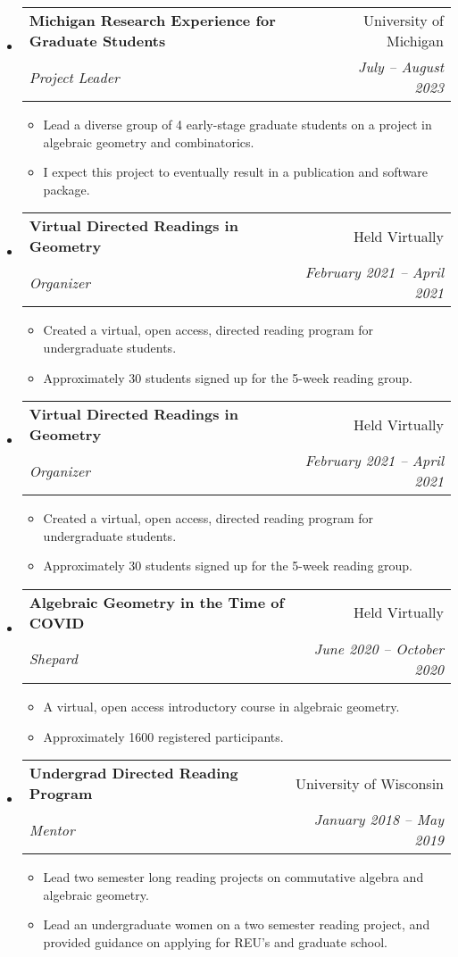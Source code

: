 \documentclass[letterpaper,11pt]{article}
\makeatletter
\newcommand{\resitem}[1]{\item #1 \vspace{-2pt}}
\newcommand{\ressubheading}[4]{
\begin{tabular*}{6.5in}[t]{l@{\cftdotfill{\cftsecdotsep}\extracolsep{\fill}}r}
		\textbf{#1} & #2 \\
		\textit{#3} & \textit{#4} \\
\end{tabular*}\vspace{-6pt}}
\makeatother
\begin{document}
\begin{itemize}

%
%
\item 
	\ressubheading{Michigan Research Experience for Graduate Students }{University of Michigan}{Project Leader}{July -- August 2023}
	\begin{itemize}
		\resitem{Lead a diverse group of 4 early-stage graduate students on a project in algebraic geometry and combinatorics.}
		\resitem{I expect this project to eventually result in a publication and software package.}
	\end{itemize}
	
\item 
	\ressubheading{Virtual Directed Readings in Geometry}{Held Virtually}{Organizer}{February 2021 -- April 2021}
	\begin{itemize}
		\resitem{Created a virtual, open access, directed reading program for undergraduate students.}
		\resitem{Approximately 30 students signed up for the 5-week reading group.}
	\end{itemize}


\item 
	\ressubheading{Virtual Directed Readings in Geometry}{Held Virtually}{Organizer}{February 2021 -- April 2021}
	\begin{itemize}
		\resitem{Created a virtual, open access, directed reading program for undergraduate students.}
		\resitem{Approximately 30 students signed up for the 5-week reading group.}
	\end{itemize}

\item 
	\ressubheading{Algebraic Geometry in the Time of COVID}{Held Virtually}{Shepard}{June 2020 -- October 2020}
	\begin{itemize}
		\resitem{A virtual, open access introductory course in algebraic geometry.}
		\resitem{Approximately 1600 registered participants.}
	\end{itemize}
		
%
%
%	
\item 
	\ressubheading{Undergrad Directed Reading Program}{University of Wisconsin}{Mentor}{January 2018 -- May 2019}
	\begin{itemize}
		\resitem{Lead two semester long reading projects on commutative algebra and algebraic geometry.}
		\resitem{Lead an undergraduate women on a two semester reading project, and provided guidance on applying for REU's and graduate school.}
	\end{itemize}
	

\end{itemize}
\end{document}
